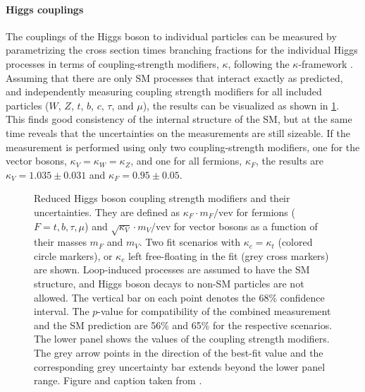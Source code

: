 \paragraph{Higgs couplings}
The couplings of the Higgs boson to individual particles can be measured by parametrizing the cross section times branching fractions for the individual Higgs processes in terms of coupling-strength modifiers, $\kappa$, following the $\kappa$-framework \cite{LHCHandbookV3}. 
Assuming that there are only SM processes that interact exactly as predicted, and independently measuring coupling strength modifiers for all included particles ($W$, $Z$, $t$, $b$, $c$, $\tau$, and $\mu$), the results can be visualized as shown in \cref{fig:h-couplings}. 
This finds good consistency of the internal structure of the SM, but at the same time reveals that the uncertainties on the measurements are still sizeable. 
If the measurement is performed using only two coupling-strength modifiers, one for the vector bosons, $\kappa_V = \kappa_W = \kappa_Z$, and one for all fermions, $\kappa_F$, the results are $\kappa_V = 1.035 \pm 0.031$ and $\kappa_F = 0.95 \pm 0.05$. 

\begin{figure}
  \caption{
    Reduced Higgs boson coupling strength modifiers and their uncertainties. They are defined as $\kappa_F \cdot m_F / \text{vev}$ for fermions
($F=t,b,\tau,\mu$) and $\sqrt{\kappa_V}\cdot m_V/\text{vev}$ for vector bosons as a
function of their masses $m_F$ and $m_V$. Two fit scenarios with $\kappa_c =
\kappa_t$ (colored circle markers), or $\kappa_c$ left free-floating in the fit (grey
cross markers) are shown. Loop-induced processes are assumed to have the SM structure, and Higgs boson decays to non-SM particles are not allowed. The vertical bar on each point denotes the 68\% confidence interval. The $p$-value for compatibility of the combined measurement and the SM prediction are 56\% and 65\% for the respective scenarios. The lower panel shows the values of the coupling strength modifiers. The grey arrow points in the direction of the best-fit value and the corresponding grey uncertainty bar extends beyond the lower panel range. Figure and caption taken from .}
  \label{fig:h-couplings}
\end{figure}

